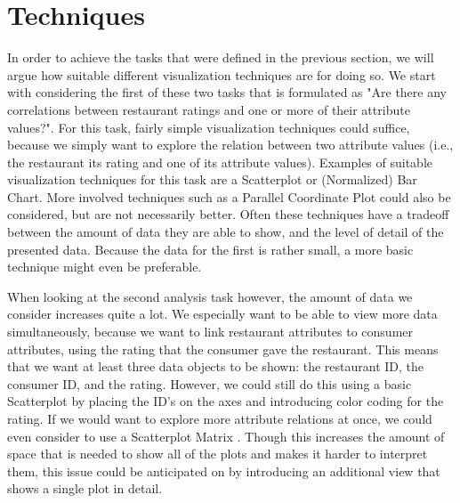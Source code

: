 \section{Techniques}\label{sec:techniques}






In order to achieve the tasks that were defined in the previous section, we will argue how suitable different visualization techniques are for doing so. We start with considering the first of these two tasks that is formulated as "Are there any correlations between restaurant ratings and one or more of their attribute values?". For this task, fairly simple visualization techniques could suffice, because we simply want to explore the relation between two attribute values (i.e., the restaurant its rating and one of its attribute values). Examples of suitable visualization techniques for this task are a Scatterplot \cite{D3scatterplot} or (Normalized) Bar Chart. More involved techniques such as a Parallel Coordinate Plot could also be considered, but are not necessarily better. Often these techniques have a tradeoff between the amount of data they are able to show, and the level of detail of the presented data. Because the data for the first is rather small, a more basic technique might even be preferable.

When looking at the second analysis task however, the amount of data we consider increases quite a lot. We especially want to be able to view more data simultaneously, because we want to link restaurant attributes to consumer attributes, using the rating that the consumer gave the restaurant. This means that we want at least three data objects to be shown: the restaurant ID, the consumer ID, and the rating. However, we could still do this using a basic Scatterplot by placing the ID's on the axes and introducing color coding for the rating. If we would want to explore more attribute relations at once, we could even consider to use a Scatterplot Matrix \cite{D3scattermatrix}. Though this increases the amount of space that is needed to show all of the plots and makes it harder to interpret them, this issue could be anticipated on by introducing an additional view that shows a single plot in detail.

